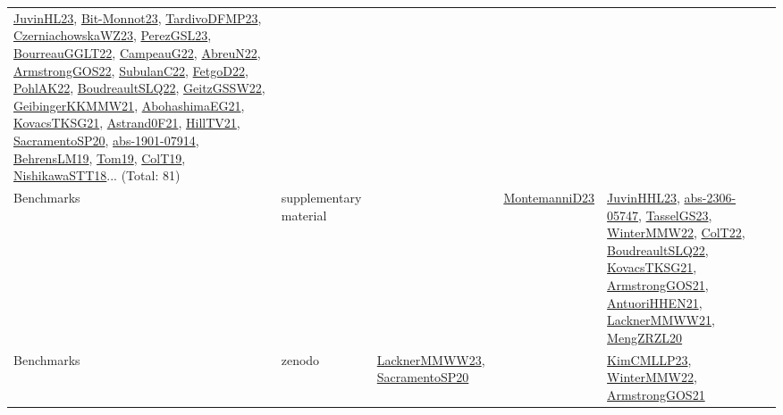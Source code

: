 {\begin{longtable}{lp{3cm}>{\raggedright}p{6cm}>{\raggedright}p{6cm}p{8cm}}
\href{papers/JuvinHL23.pdf}{JuvinHL23}\cite{JuvinHL23}, \href{papers/Bit-Monnot23.pdf}{Bit-Monnot23}\cite{Bit-Monnot23}, \href{papers/TardivoDFMP23.pdf}{TardivoDFMP23}\cite{TardivoDFMP23}, \href{articles/CzerniachowskaWZ23.pdf}{CzerniachowskaWZ23}\cite{CzerniachowskaWZ23}, \href{papers/PerezGSL23.pdf}{PerezGSL23}\cite{PerezGSL23}, \href{articles/BourreauGGLT22.pdf}{BourreauGGLT22}\cite{BourreauGGLT22}, \href{articles/CampeauG22.pdf}{CampeauG22}\cite{CampeauG22}, \href{articles/AbreuN22.pdf}{AbreuN22}\cite{AbreuN22}, \href{papers/ArmstrongGOS22.pdf}{ArmstrongGOS22}\cite{ArmstrongGOS22}, \href{articles/SubulanC22.pdf}{SubulanC22}\cite{SubulanC22}, \href{articles/FetgoD22.pdf}{FetgoD22}\cite{FetgoD22}, \href{articles/PohlAK22.pdf}{PohlAK22}\cite{PohlAK22}, \href{papers/BoudreaultSLQ22.pdf}{BoudreaultSLQ22}\cite{BoudreaultSLQ22}, \href{papers/GeitzGSSW22.pdf}{GeitzGSSW22}\cite{GeitzGSSW22}, \href{papers/GeibingerKKMMW21.pdf}{GeibingerKKMMW21}\cite{GeibingerKKMMW21}, \href{articles/AbohashimaEG21.pdf}{AbohashimaEG21}\cite{AbohashimaEG21}, \href{papers/KovacsTKSG21.pdf}{KovacsTKSG21}\cite{KovacsTKSG21}, \href{papers/Astrand0F21.pdf}{Astrand0F21}\cite{Astrand0F21}, \href{papers/HillTV21.pdf}{HillTV21}\cite{HillTV21}, \href{articles/SacramentoSP20.pdf}{SacramentoSP20}\cite{SacramentoSP20}, \href{articles/abs-1901-07914.pdf}{abs-1901-07914}\cite{abs-1901-07914}, \href{papers/BehrensLM19.pdf}{BehrensLM19}\cite{BehrensLM19}, \href{papers/Tom19.pdf}{Tom19}\cite{Tom19}, \href{papers/ColT19.pdf}{ColT19}\cite{ColT19}, \href{papers/NishikawaSTT18.pdf}{NishikawaSTT18}\cite{NishikawaSTT18}... (Total: 81)\\
Benchmarks & supplementary material &  & \href{articles/MontemanniD23.pdf}{MontemanniD23}\cite{MontemanniD23} & \href{papers/JuvinHHL23.pdf}{JuvinHHL23}\cite{JuvinHHL23}, \href{articles/abs-2306-05747.pdf}{abs-2306-05747}\cite{abs-2306-05747}, \href{papers/TasselGS23.pdf}{TasselGS23}\cite{TasselGS23}, \href{papers/WinterMMW22.pdf}{WinterMMW22}\cite{WinterMMW22}, \href{articles/ColT22.pdf}{ColT22}\cite{ColT22}, \href{papers/BoudreaultSLQ22.pdf}{BoudreaultSLQ22}\cite{BoudreaultSLQ22}, \href{papers/KovacsTKSG21.pdf}{KovacsTKSG21}\cite{KovacsTKSG21}, \href{papers/ArmstrongGOS21.pdf}{ArmstrongGOS21}\cite{ArmstrongGOS21}, \href{papers/AntuoriHHEN21.pdf}{AntuoriHHEN21}\cite{AntuoriHHEN21}, \href{papers/LacknerMMWW21.pdf}{LacknerMMWW21}\cite{LacknerMMWW21}, \href{articles/MengZRZL20.pdf}{MengZRZL20}\cite{MengZRZL20}\\
Benchmarks & zenodo & \href{articles/LacknerMMWW23.pdf}{LacknerMMWW23}\cite{LacknerMMWW23}, \href{articles/SacramentoSP20.pdf}{SacramentoSP20}\cite{SacramentoSP20} &  & \href{papers/KimCMLLP23.pdf}{KimCMLLP23}\cite{KimCMLLP23}, \href{papers/WinterMMW22.pdf}{WinterMMW22}\cite{WinterMMW22}, \href{papers/ArmstrongGOS21.pdf}{ArmstrongGOS21}\cite{ArmstrongGOS21}\\

\end{longtable}}
